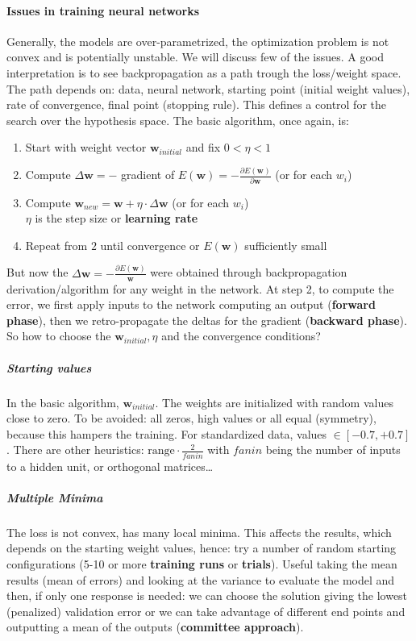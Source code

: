 \documentclass[10pt]{report}
\begin{document}
\paragraph{Issues in training neural networks} Generally, the models are over-parametrized, the optimization problem is not convex and is potentially unstable. We will discuss few of the issues. A good interpretation is to see backpropagation as a path trough the loss/weight space. The path depends on: data, neural network, starting point (initial weight values), rate of convergence, final point (stopping rule). This defines a control for the search over the hypothesis space. The basic algorithm, once again, is:
\begin{enumerate}
	\item Start with weight vector $\mathbf{w}_{initial}$ and fix $0 < \eta < 1$
	\item Compute $\Delta \mathbf{w} = -$ gradient of $E(\mathbf{w}) = -\frac{\partial E(\mathbf{w})}{\partial \mathbf{w}}$ (or for each $w_i$)
	\item Compute $\mathbf{w}_{new} = \mathbf{w} + \eta\cdot\Delta \mathbf{w}$ (or for each $w_i$)\\
	$\eta$ is the step size or \textbf{learning rate}
	\item Repeat from $2$ until convergence or $E(\mathbf{w})$ sufficiently small
\end{enumerate}
But now the $\Delta \mathbf{w} =-\frac{\partial E(\mathbf{w})}{\mathbf{w}}$ were obtained through backpropagation derivation/algorithm for any weight in the network. At step 2, to compute the error, we first apply inputs to the network computing an output (\textbf{forward phase}), then we retro-propagate the deltas for the gradient (\textbf{backward phase}). So how to choose the $\mathbf{w}_{initial}, \eta$ and the convergence conditions?
\subparagraph{Starting values} In the basic algorithm, $\mathbf{w}_{initial}$. The weights are initialized with random values close to zero. To be avoided: all zeros, high values or all equal (symmetry), because this hampers the training. For standardized data, values $\in [-0.7, +0.7]$. There are other heuristics: $\text{range} \cdot \frac{2}{fanin}$ with $fanin$ being the number of inputs to a hidden unit, or orthogonal matrices\ldots
\subparagraph{Multiple Minima} The loss is not convex, has many local minima. This affects the results, which depends on the starting weight values, hence: try a number of random starting configurations (5-10 or more \textbf{training runs} or \textbf{trials}). Useful taking the mean results (mean of errors) and looking at the variance to evaluate the model and then, if only one response is needed: we can choose the solution giving the lowest (penalized) validation error or we can take advantage of different end points and outputting a mean of the outputs (\textbf{committee approach}).\\
\end{document}
